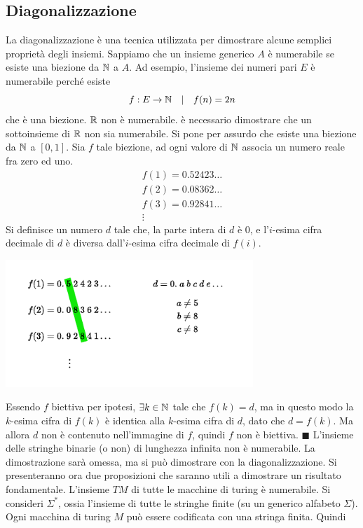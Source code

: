 \documentclass[10pt, letterpaper]{report}
\begin{document}
\subsection{Diagonalizzazione}
La diagonalizzazione è una tecnica utilizzata per dimostrare alcune semplici proprietà degli insiemi. Sappiamo che un insieme generico $A$ è numerabile se esiste una biezione da ${\mathbb N}$ a $A$. Ad esempio, l'insieme dei numeri pari $E$ è numerabile perché esiste $$ f:E\rightarrow {\mathbb N}\ \ \ | \ \ \  f(n)=2n$$ che è una biezione.\acc 
\teo{} ${\mathbb R}$ non è numerabile.\acc 
\dimo{} è necessario dimostrare che un sottoinsieme di ${\mathbb R}$ non sia numerabile. Si pone per assurdo che esiste una biezione da ${\mathbb N}$ a $[0,1]$. Sia $f$ tale biezione, ad ogni valore di ${\mathbb N}$ associa un numero reale fra zero ed uno.$$ \begin{matrix}
    f(1)=0.52423\dots\\ 
    f(2)=0.08362\dots\\ 
    f(3)=0.92841\dots\\ \vdots
\end{matrix}$$
Si definisce un numero $d$ tale che, la parte intera di $d$ è 0, e l'$i$-esima cifra decimale di $d$ è diversa dall'$i$-esima cifra decimale di $f(i)$.\begin{center}
    \includegraphics[width=0.7\textwidth ]{images/realiNonNumerabili..pdf}
\end{center}
Essendo $f$ biettiva per ipotesi, $\exists k \in {\mathbb N} $ tale che $ f(k)=d$, ma in questo modo la $k$-esima cifra di $f(k)$ è identica alla $k$-esima cifra di $d$, dato che $d=f(k)$. Ma allora $d$ non è contenuto nell'immagine di $f$, quindi $f$ non è biettiva. \hfill$\blacksquare$\acc 
\prop{} L'insieme delle stringhe binarie (o non) di lunghezza infinita non è numerabile.\acc 
La dimostrazione sarà omessa, ma si può dimostrare con la diagonalizzazione. Si presenteranno ora due proposizioni che saranno utili a dimostrare un risultato fondamentale.\acc 
{} L'insieme $TM$ di tutte le macchine di turing è numerabile.\acc 
{} Si consideri $\Sigma^*$, ossia l'insieme di tutte le stringhe finite (su un generico alfabeto $\Sigma$). Ogni macchina di turing $M$ può essere codificata con una stringa finita. Quindi 
\end{document}
